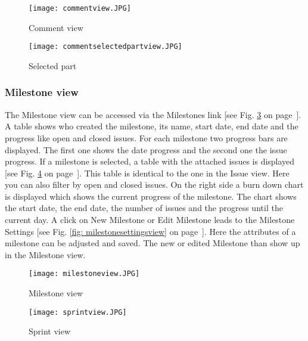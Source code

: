     \begin{figure}[h]
        \centering
        \texttt{[image: commentview.JPG]}
        \caption{Comment view}
        \label{fig: commentview}
    \end{figure}

    \begin{figure}[h]
        \centering
        \texttt{[image: commentselectedpartview.JPG]}
        \caption{Selected part}
        \label{fig: commentselectedpartview}
    \end{figure}

    \subsubsection*{Milestone view}
    The Milestone view can be accessed via the Milestones link [see Fig. \ref{fig: milestoneview} on page~\pageref{fig: milestoneview}]. A table shows who created the milestone, its name, start date, end date and the progress like open and closed issues. For each milestone two progress bars are displayed. The first one shows the date progress and the second one the issue progress. If a milestone is selected, a table with the attached issues is displayed [see Fig. \ref{fig: sprintview} on page~\pageref{fig: sprintview}]. This table is identical to the one in the Issue view. Here you can also filter by open and closed issues. On the right side a burn down chart is displayed which shows the current progress of the milestone. The chart shows the start date, the end date, the number of issues and the progress until the current day. A click on New Milestone or Edit Milestone leads to the Milestone Settings [see Fig. \ref{fig: milestonesettingsview} on page~\pageref{fig: milestonesettingsview}]. Here the attributes of a milestone can be adjusted and saved. The new or edited Milestone than show up in the Milestone view.

    \begin{figure}[h]
        \centering
        \texttt{[image: milestoneview.JPG]}
        \caption{Milestone view}
        \label{fig: milestoneview}
    \end{figure}

    \begin{figure}[h]
        \centering
        \texttt{[image: sprintview.JPG]}
        \caption{Sprint view}
        \label{fig: sprintview}
    \end{figure}

